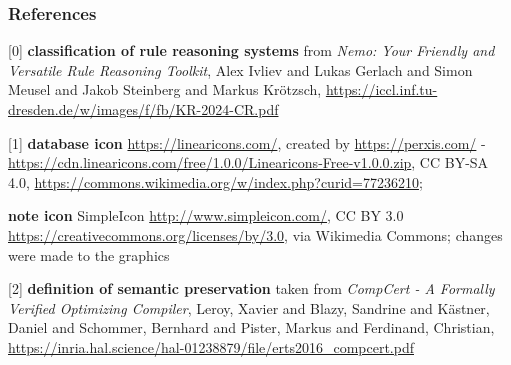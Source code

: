 \documentclass[aspectratio=169]{beamer}
\begin{document}
\begin{frame}
	\frametitle{References}
	\tiny{
	[0] \textbf{classification of rule reasoning systems} from \textit{Nemo: Your Friendly and Versatile Rule Reasoning Toolkit}, Alex Ivliev and Lukas Gerlach and Simon Meusel and Jakob Steinberg and Markus Krötzsch, \url{https://iccl.inf.tu-dresden.de/w/images/f/fb/KR-2024-CR.pdf}
	
	[1] \textbf{database icon} \url{https://linearicons.com/}, created by \url{https://perxis.com/} - \url{https://cdn.linearicons.com/free/1.0.0/Linearicons-Free-v1.0.0.zip}, CC BY-SA 4.0, \url{https://commons.wikimedia.org/w/index.php?curid=77236210};
	
	\textbf{note icon} SimpleIcon \url{http://www.simpleicon.com/}, CC BY 3.0 \url{https://creativecommons.org/licenses/by/3.0}, via Wikimedia Commons; changes were made to the graphics
	
	[2] \textbf{definition of semantic preservation} taken from \textit{CompCert - A Formally Verified Optimizing Compiler}, Leroy, Xavier and Blazy, Sandrine and Kästner, Daniel and Schommer, Bernhard and Pister, Markus and Ferdinand, Christian, \url{https://inria.hal.science/hal-01238879/file/erts2016_compcert.pdf}}
  
\end{frame}


	
\end{document}
